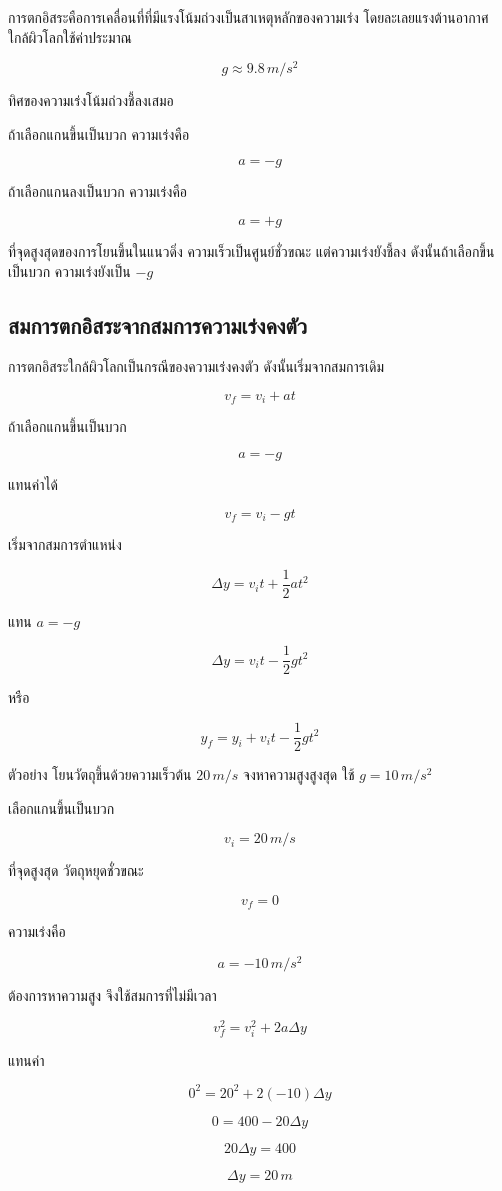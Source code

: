 \documentclass[12pt,a4paper]{report}
\begin{document}
การตกอิสระคือการเคลื่อนที่ที่มีแรงโน้มถ่วงเป็นสาเหตุหลักของความเร่ง โดยละเลยแรงต้านอากาศ ใกล้ผิวโลกใช้ค่าประมาณ

\[
g\approx 9.8\,\si{m/s^2}
\]

ทิศของความเร่งโน้มถ่วงชี้ลงเสมอ

ถ้าเลือกแกนขึ้นเป็นบวก ความเร่งคือ

\[
a=-g
\]

ถ้าเลือกแกนลงเป็นบวก ความเร่งคือ

\[
a=+g
\]

\begin{tcolorbox}[title=จุดสำคัญ]
ที่จุดสูงสุดของการโยนขึ้นในแนวดิ่ง ความเร็วเป็นศูนย์ชั่วขณะ แต่ความเร่งยังชี้ลง ดังนั้นถ้าเลือกขึ้นเป็นบวก ความเร่งยังเป็น $-g$
\end{tcolorbox}

\subsection{สมการตกอิสระจากสมการความเร่งคงตัว}

การตกอิสระใกล้ผิวโลกเป็นกรณีของความเร่งคงตัว ดังนั้นเริ่มจากสมการเดิม

\[
v_f=v_i+at
\]

ถ้าเลือกแกนขึ้นเป็นบวก

\[
a=-g
\]

แทนค่าได้

\[
v_f=v_i-gt
\]

เริ่มจากสมการตำแหน่ง

\[
\Delta y=v_it+\frac{1}{2}at^2
\]

แทน $a=-g$

\[
\Delta y=v_it-\frac{1}{2}gt^2
\]

หรือ

\[
y_f=y_i+v_it-\frac{1}{2}gt^2
\]

\begin{examplebox}{ตัวอย่าง}
โยนวัตถุขึ้นด้วยความเร็วต้น $20\,\si{m/s}$ จงหาความสูงสูงสุด ใช้ $g=10\,\si{m/s^2}$

เลือกแกนขึ้นเป็นบวก

\[
v_i=20\,\si{m/s}
\]

ที่จุดสูงสุด วัตถุหยุดชั่วขณะ

\[
v_f=0
\]

ความเร่งคือ

\[
a=-10\,\si{m/s^2}
\]

ต้องการหาความสูง จึงใช้สมการที่ไม่มีเวลา

\[
v_f^2=v_i^2+2a\Delta y
\]

แทนค่า

\[
0^2=20^2+2(-10)\Delta y
\]

\[
0=400-20\Delta y
\]

\[
20\Delta y=400
\]

\[
\Delta y=20\,\si{m}
\]
\end{examplebox}
\end{document}
